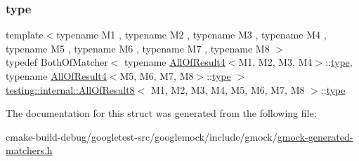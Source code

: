 \subsubsection{\texorpdfstring{type}{type}}
{\footnotesize\ttfamily template$<$typename M1 , typename M2 , typename M3 , typename M4 , typename M5 , typename M6 , typename M7 , typename M8 $>$ \\
typedef Both\+Of\+Matcher$<$ typename \mbox{\hyperlink{structtesting_1_1internal_1_1AllOfResult4}{All\+Of\+Result4}}$<$M1, M2, M3, M4$>$\+::\mbox{\hyperlink{structtesting_1_1internal_1_1AllOfResult8_a7103892a28c35221b9e62e871c577727}{type}}, typename \mbox{\hyperlink{structtesting_1_1internal_1_1AllOfResult4}{All\+Of\+Result4}}$<$M5, M6, M7, M8$>$\+::\mbox{\hyperlink{structtesting_1_1internal_1_1AllOfResult8_a7103892a28c35221b9e62e871c577727}{type}} $>$ \mbox{\hyperlink{structtesting_1_1internal_1_1AllOfResult8}{testing\+::internal\+::\+All\+Of\+Result8}}$<$ M1, M2, M3, M4, M5, M6, M7, M8 $>$\+::\mbox{\hyperlink{structtesting_1_1internal_1_1AllOfResult8_a7103892a28c35221b9e62e871c577727}{type}}}



The documentation for this struct was generated from the following file\+:\begin{DoxyCompactItemize}
\item 
cmake-\/build-\/debug/googletest-\/src/googlemock/include/gmock/\mbox{\hyperlink{gmock-generated-matchers_8h}{gmock-\/generated-\/matchers.\+h}}\end{DoxyCompactItemize}
